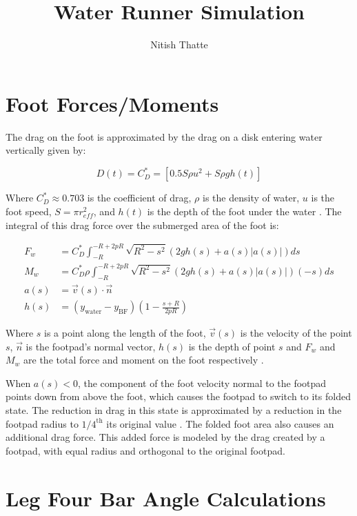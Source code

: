 \documentclass[letterpaper]{article}
\title{Water Runner Simulation}
\author{Nitish Thatte}
\begin{document}
\maketitle

\section{Foot Forces/Moments}

The drag on the foot is approximated by the drag on a disk entering water vertically  given by:

\begin{equation}
	D(t) = C_D^* = [0.5 S \rho u^2 + S \rho g h(t)]
\end{equation}

\noindent Where $C_D^* \approx 0.703$ is the coefficient of drag, $\rho$ is the density of water, $u$ is the foot speed, $S = \pi r_{eff}^2$, and $h(t)$ is the depth of the foot under the water \cite{Glasheen1996a}. The integral of this drag force over the submerged area of the foot is:

\begin{align}
F_w &= C_D^* \int_{-R}^{-R+2pR} \sqrt{R^2 - s^2} (2gh(s) + a(s)|a(s)|) ds \label{eq:footF}\\
M_w &= C_D^* \rho \int_{-R}^{-R + 2pR} \sqrt{R^2 - s^2} (2gh(s) + a(s)|a(s)|)(-s) ds \label{eq:footM} \\
a(s) &= \vec{v}(s) \cdot \vec{n} \\
h(s) &= (y_\mathrm{water} - y_\mathrm{BF} ) \left( 1 - \frac{s + R}{2 p R} \right)
\end{align}

\noindent Where $s$ is a point along the length of the foot, $\vec{v}(s)$ is the velocity of the point $s$, $\vec{n}$ is the footpad's normal vector, $h(s)$ is the depth of point $s$ and $F_w$ and $M_w$ are the total force and moment on the foot respectively \cite{Floyd2008}.

When $a(s) < 0$, the component of the foot velocity normal to the footpad points down from above the foot, which causes the footpad to switch to its folded state. The reduction in drag in this state is approximated by a reduction in the footpad radius to $1/4^\textrm{th}$ its original value \cite{Floyd2009}. The folded foot area also causes an additional drag force. This added force is modeled by the drag created by a footpad, with equal radius and orthogonal to the original footpad.

\section{Leg Four Bar Angle Calculations}
\end{document}
